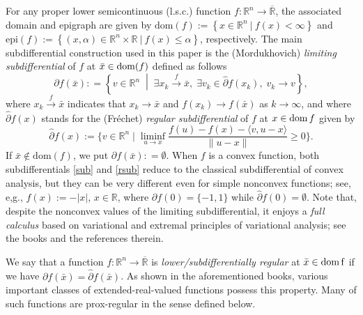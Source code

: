 \documentclass[11pt,a4paper]{article}
\def\hat{\widehat}\def\Hat{\widehat}
\def\Bar{\overline}
\def\la{\langle}
\def\ra{\rangle}
\theoremstyle{plain}
\begin{document}
For any proper lower semicontinuous (l.s.c.) function  \( f: \mathbb{R}^n \to\Bar{\mathbb{R}}\), the associated domain and epigraph are given by $\text{dom}(f):=\left\{x\in\mathbb{R}^n ~|~ f(x)<\infty\right\}$ and $\text{epi}(f):=\left\{(x,\alpha)\in\mathbb{R}^n\times\mathbb{R} ~|~f(x)\leq\alpha\right\}$, respectively. The main subdifferential construction used in this paper is the (Mordukhovich) {\em limiting subdifferential} of $f$ at 
$\bar x\in{\rm dom}(f)$ defined as follows
\begin{equation}\label{sub}
\partial f(\bar{x}): = \left\{ v \in \mathbb{R}^n \;\middle|\; \exists x_k \xrightarrow{f} \bar{x}, \; \exists v_k \in \hat{\partial} f(x_k), \; v_k \to v \right\},
\end{equation}
where \( x_k \xrightarrow{f} \bar{x} \) indicates that \( x_k \to \bar{x} \) and \( f(x_k) \to f(\bar{x}) \) as \( k \to \infty \), and where $\hat{\partial} f(x)$ stands for the (Fr\'echet) {\em regular subdifferential} of $f$ at $x\in{\rm dom}\, f$ given by
\begin{equation}\label{rsub}
\hat\partial f(x):=\Big\{v\in\mathbb{R}^n\;\Big|\;\mathop{\lim\inf}\limits_{u\to x}\frac{f(u)-f(x)-\la v,u-x\ra}{\|u-x\|}\ge 0\Big\}.
\end{equation}
If \( \bar{x} \notin \mathrm{dom}(f)\), we put \(\partial f(\bar{x}): = \emptyset\). When $f$ is a convex function, both subdifferentials \eqref{sub} and \eqref{rsub} reduce to the classical subdifferential of convex analysis, but they can be very different even for simple nonconvex functions; see, e,g., $f(x):=-|x|$, $x\in\mathbb R$, where $\partial f(0)=\{-1,1\}$ while $\hat\partial f(0)=\emptyset$.  Note that, despite the nonconvex values of the limiting subdifferential, it enjoys a {\em full calculus} based on variational and extremal principles of variational analysis; see the books \cite{mordukhovich2006variational,mordukhovich2018variational,rockafellar1998variational} and the references therein.\vspace*{0.05in}

We say that a function $f\colon\mathbb{R}^n\to\Bar{\mathbb{R}}$ is {\em lower/subdifferentially regular} at $\bar x\in\rm{dom}\,f$ if we have $\partial f(\bar x)=\Hat\partial f(\bar x)$. As shown in the aforementioned books, various important classes of extended-real-valued functions possess this property. Many of such functions are prox-regular in the sense defined below.
\end{document}
